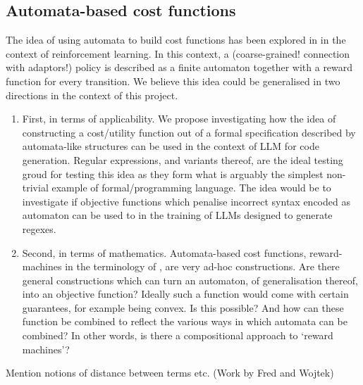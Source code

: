 \documentclass[11pt,a4paper]{article}
\begin{document}
		\subsection{Automata-based cost functions}
			The idea of using automata to build cost functions has been explored in \cite{icarte2022reward} in the context of reinforcement learning. In this context, a (coarse-grained! connection with adaptors!) policy is described as a finite automaton together with a reward function for every transition.  
			We believe this idea could be generalised in two directions in the context of this project.
			\begin{enumerate}
				\item First, in terms of applicability. We propose investigating how the idea of constructing a cost/utility function out of a formal specification described by automata-like structures can be used in the context of LLM for code generation. Regular expressions, and variants thereof, are the ideal testing groud for testing this idea as they form what is arguably the simplest non-trivial example of formal/programming language. The idea would be to investigate if objective functions which penalise incorrect syntax encoded as automaton can be used to in the training of LLMs designed to generate regexes.
				\item Second, in terms of mathematics. Automata-based cost functions, reward-machines in the terminology of \cite{icarte2022reward}, are very ad-hoc constructions. Are there general constructions which can turn an automaton, of generalisation thereof, into an objective function? Ideally such a function would come with certain guarantees, for example being convex. Is this possible? And how can these function be combined to reflect the various ways in which automata can be combined? In other words, is there a compositional approach to `reward machines'?
			\end{enumerate} 
		
			Mention notions of distance between terms etc. (Work by Fred and Wojtek)
			
\end{document}
